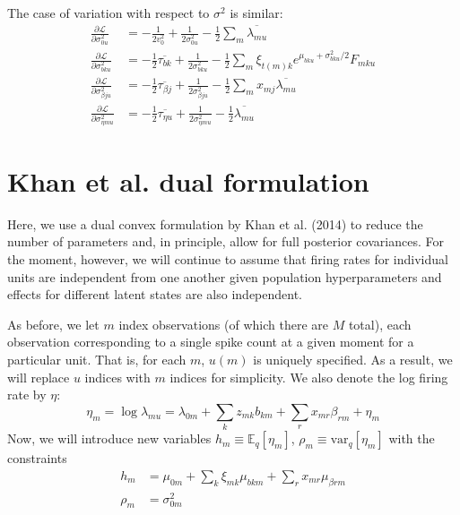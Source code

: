 \documentclass[11pt]{article}
\begin{document}
The case of variation with respect to $\sigma^2$ is similar:
\begin{align}
    \frac{\partial\mathcal{L}}{\partial \sigma^2_{0u}} &= -\frac{1}{2v_0^2} + \frac{1}{2\sigma^2_{0u}} - \frac{1}{2} \sum_m \overline{\lambda_{mu}} \\
    \frac{\partial\mathcal{L}}{\partial \sigma^2_{bku}} &= 
    - \frac{1}{2} \overline{\tau_{bk}} + \frac{1}{2\sigma^2_{bku}} - \frac{1}{2}\sum_m \xi_{t(m)k} e^{\mu_{bku} + \sigma^2_{bku} / 2} F_{mku}  \\
    \frac{\partial\mathcal{L}}{\partial \sigma^2_{\beta ju}} &= 
    - \frac{1}{2} \overline{\tau_{\beta j}} + \frac{1}{2\sigma^2_{\beta ju}} - \frac{1}{2} \sum_m x_{mj} \overline{\lambda_{mu}} \\
    \frac{\partial\mathcal{L}}{\partial \sigma^2_{\eta mu}} &= 
    -\frac{1}{2} \overline{\tau_{\eta u}} + \frac{1}{2\sigma^2_{\eta mu}} - \frac{1}{2} \overline{\lambda_{mu}}
\end{align}

\section{Khan et al. dual formulation}
Here, we use a dual convex formulation by Khan et al. (2014) to reduce the number of parameters and, in principle, allow for full posterior covariances. For the moment, however, we will continue to assume that firing rates for individual units are independent from one another given population hyperparameters and effects for different latent states are also independent.

As before, we let $m$ index observations (of which there are $M$ total), each observation corresponding to a single spike count at a given moment for a particular unit. That is, for each $m$, $u(m)$ is uniquely specified. As a result, we will replace $u$ indices with $m$ indices for simplicity. We also denote the log firing rate by $\eta$:
\begin{equation}
    \eta_m = \log \lambda_{mu} = \lambda_{0m} + \sum_k z_{mk} b_{k m} + \sum_r x_{mr} \beta_{r m} + \eta_m
\end{equation}
Now, we will introduce new variables $h_m \equiv \mathbb{E}_q[\eta_m]$, $\rho_m \equiv \mathrm{var}_q[\eta_m]$ with the constraints
\begin{align}
    h_m &= \mu_{0m} + \sum_k \xi_{mk} \mu_{bkm} + \sum_r x_{mr} \mu_{\beta rm} \\
    \rho_m &= \sigma^2_{0m} 
\end{align}
\end{document}
